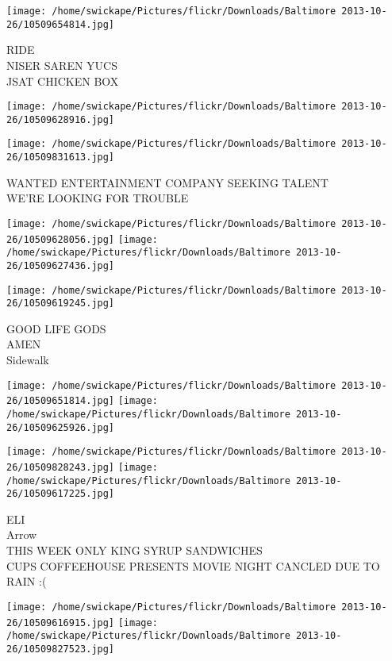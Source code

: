 \documentclass[10pt,letterpaper]{article}
\begin{document}
\texttt{[image: /home/swickape/Pictures/flickr/Downloads/Baltimore 2013-10-26/10509654814.jpg]}

RIDE\\
NISER SAREN YUCS\\
JSAT CHICKEN BOX\\
\pagebreak

\texttt{[image: /home/swickape/Pictures/flickr/Downloads/Baltimore 2013-10-26/10509628916.jpg]}

\vspace{0.25in}
\texttt{[image: /home/swickape/Pictures/flickr/Downloads/Baltimore 2013-10-26/10509831613.jpg]}

WANTED ENTERTAINMENT COMPANY SEEKING TALENT\\
WE'RE LOOKING FOR TROUBLE\\
\pagebreak

\texttt{[image: /home/swickape/Pictures/flickr/Downloads/Baltimore 2013-10-26/10509628056.jpg]}
\texttt{[image: /home/swickape/Pictures/flickr/Downloads/Baltimore 2013-10-26/10509627436.jpg]}

\vspace{0.25in}
\texttt{[image: /home/swickape/Pictures/flickr/Downloads/Baltimore 2013-10-26/10509619245.jpg]}

GOOD LIFE GODS\\
AMEN\\
Sidewalk\\
\pagebreak

\texttt{[image: /home/swickape/Pictures/flickr/Downloads/Baltimore 2013-10-26/10509651814.jpg]}
\texttt{[image: /home/swickape/Pictures/flickr/Downloads/Baltimore 2013-10-26/10509625926.jpg]}

\texttt{[image: /home/swickape/Pictures/flickr/Downloads/Baltimore 2013-10-26/10509828243.jpg]}
\texttt{[image: /home/swickape/Pictures/flickr/Downloads/Baltimore 2013-10-26/10509617225.jpg]}

ELI\\
Arrow\\
THIS WEEK ONLY KING SYRUP SANDWICHES\\
CUPS COFFEEHOUSE PRESENTS MOVIE NIGHT CANCLED DUE TO RAIN :(\\
\pagebreak

\texttt{[image: /home/swickape/Pictures/flickr/Downloads/Baltimore 2013-10-26/10509616915.jpg]}
\texttt{[image: /home/swickape/Pictures/flickr/Downloads/Baltimore 2013-10-26/10509827523.jpg]}
\end{document}
